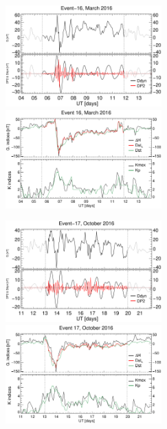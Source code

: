 \documentclass[a4paper,fleqn]{cas-dc}
\begin{document}
\begin{figure}[h!]
    \centering
    \centerline{\Large \bf   
         \hfill}
          \centerline{\Large \bf   
      \hspace{0.26\textwidth}  \color{black}{}
       \hspace{0.31\textwidth}  \color{black}{}
         \hfill}
    \includegraphics[width=6.0cm]{images/diono/iono_PI_V1_2016-03-04.eps}   
	\includegraphics[width=6.0cm]{images/dH_approx/diono_valid_V4_2016-03-04.eps} 	 
     \centerline{\Large \bf   
      \hspace{0.275\textwidth}  \color{black}{}
       \hspace{0.295\textwidth}  \color{black}{}
         \hfill}
    \includegraphics[width=6.0cm]{images/diono/iono_PI_V1_2016-10-11.eps}  
	\includegraphics[width=6.0cm]{images/dH_approx/diono_valid_V4_2016-10-11.eps}

\end{figure}
\end{document}
